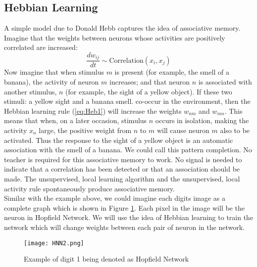 \subsection{Hebbian Learning}
A simple model due to Donald Hebb captures the idea of associative memory. Imagine that the weights between neurons whose activities are positively correlated are increased:
\begin{equation}
	\label{eq:Heb1}
	\frac{dw_{ij}}{dt} \sim \text{Correlation}(x_i, x_j)
  \end{equation}
  Now imagine that when stimulus $m$ is present (for example, the smell of a banana), the activity of neuron $m$ increases; and that neuron $n$ is associated with another stimulus, $n$ (for example, the sight of a yellow object). If these two stimuli: a yellow sight and a banana smell. co-occur in the environment, then the Hebbian learning rule (\ref{eq:Heb1}) will increase the weights $w_{nm}$ and $w_{mn}$. This means that when, on a later occasion, stimulus $n$ occurs in isolation, making the activity $x_n$ large, the positive weight from $n$ to $m$ will cause neuron $m$ also to be activated. Thus the response to the sight of a yellow object is an automatic association with the smell of a banana. We could call this pattern completion. No teacher is required for this associative memory to work. No signal is needed to indicate that a correlation has been detected or that an association should be made. The unsupervised, local learning algorithm and the unsupervised, local activity rule spontaneously produce associative memory\cite{bib:info-theory, bib:Pradeepta}.\\

  Similar with the example above, we could imagine each digits image as a complete graph which is shown in Figure \ref{fg:HNN2}. Each pixel in the image will be the neuron in Hopfield Network. We will use the idea of Hebbian learning to train the network which will change weights between each pair of neuron in the network.\\
  \begin{figure}[h]
  \centering
  \texttt{[image: HNN2.png]}
  \caption{Example of digit 1 being denoted as Hopfield Network}
  \label{fg:HNN2}
  \end{figure}

